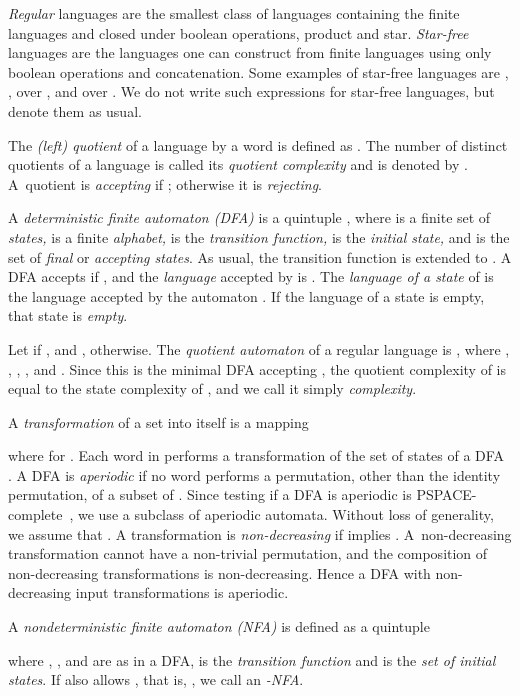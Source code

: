 \documentclass{llncs}
\begin{document}
\emph{Regular} languages are the smallest class of languages containing the finite languages and closed under boolean operations, product  and  star. 
\emph{Star-free} languages are the languages one can construct from finite languages using only boolean operations and concatenation.
Some examples of star-free languages are , , 
 over ,  and
 over . We do not write such expressions for star-free  languages, but denote them as usual.

The \emph{(left) quotient} of a language  by a word  is defined as . The number of distinct quotients of a language  is called its \emph{quotient complexity}  and is denoted by . 
A~quotient  is \emph{accepting} if ; 
otherwise it is \emph{rejecting}.


A \emph{deterministic finite automaton (DFA)} is a quintuple , where  is a finite set of \emph{states,}  is a finite \emph{alphabet,}  is the \emph{transition function,}  is the \emph{initial state,} and  is the set of \emph{final} or \emph{accepting states\/}. 
As usual, the transition function is extended to . 
A DFA  accepts  if , and the \emph{language} accepted by  is . 
The \emph{language of a state}  of  is the language  accepted by the automaton . 
If the language of a state is empty, that state is \emph{empty}.

Let  if , and , otherwise.
The \emph{quotient automaton} of a regular language  is 
, where , , 
,  , and .
Since this  is the minimal DFA accepting , the quotient complexity of  is equal to the state complexity of , and we call it simply  \emph{complexity}.

A \emph{transformation} of a set  into itself is a mapping 

where  for . 
Each word in  performs a transformation of the set  of states of a DFA .
A DFA is \emph{aperiodic} if no word performs a permutation, other than the identity permutation, of a subset of .
Since testing if a DFA is aperiodic is PSPACE-complete~\cite{ChHu91}, we  use a subclass of aperiodic automata. 
Without loss of generality, we assume that .
A transformation is \emph{non-decreasing} if  implies .
A~non-decreasing transformation cannot have a non-trivial permutation, and the composition of non-decreasing transformations is non-decreasing. 
Hence a DFA with non-decreasing input transformations is aperiodic.

A \emph{nondeterministic finite automaton  (NFA)} is defined as a quintuple

 where 
 , , and  are as in a DFA, 
  is the \emph{transition function} and
  is the \emph{set of initial states}. 
If  also allows , 
that is, , 
we call  an \emph{-NFA}.
\end{document}
